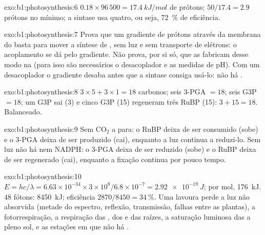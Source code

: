 \begin{solution}{exo:b1:photosynthesis:6}
$0.18\times 96\,500 = \qty{17.4}{kJ/mol}$ de prótons; $50/17.4 = 2.9$
prótons no mínimo; a sintase usa quatro, ou seja, \qty{72}{\%} de
eficiência.
\end{solution}

\begin{solution}{exo:b1:photosynthesis:7}
Prova que um gradiente de prótons através da membrana do  basta
para mover a síntese de , sem luz e sem transporte de elétrons: o
acoplamento se dá pelo gradiente. Não prova, por si só, que as  fabricam  desse modo na  (para isso são necessários o
desacoplador e as medidas de pH). Com um desacoplador o gradiente desaba
antes que a sintase consiga usá-lo: não há .
\end{solution}

\begin{solution}{exo:b1:photosynthesis:8}
$3\times 5 + 3\times 1 = 18$ carbonos; seis 3-PGA $= 18$; seis G3P
$= 18$; um G3P sai (3) e cinco G3P (15) regeneram três RuBP (15): $3 +
15 = 18$. Balanceado.
\end{solution}

\begin{solution}{exo:b1:photosynthesis:9}
Sem $\mathrm{CO_2}$ a  para: o RuBP deixa de ser consumido (sobe)
e o 3-PGA deixa de ser produzido (cai), enquanto a luz continua a
reduzi-lo. Sem luz não há  nem NADPH: o 3-PGA deixa de ser reduzido
(sobe) e o RuBP deixa de ser regenerado (cai), enquanto a fixação
continua por pouco tempo.
\end{solution}

\begin{solution}{exo:b1:photosynthesis:10}
$E = hc/\lambda = 6.63\times 10^{-34}\times 3\times 10^8/6.8\times
10^{-7} = \qty{2.92e-19}{J}$; por mol, \qty{176}{kJ}. 48 fótons:
\qty{8450}{kJ}; eficiência $2870/8450 = \qty{34}{\%}$. Uma lavoura perde
a luz não absorvida (metade do espectro, reflexão, transmissão, falhas
entre as plantas), a fotorrespiração, a respiração das , dos
 e das raízes, a saturação luminosa das  a pleno sol, e as
estações em que não há .
\end{solution}

